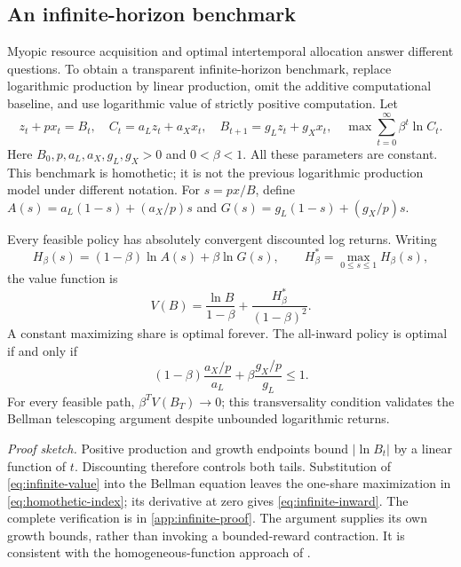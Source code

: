 \subsection{An infinite-horizon benchmark}
\label{sec:dynamic}
Myopic resource acquisition and optimal intertemporal allocation answer
different questions. To obtain a transparent infinite-horizon benchmark,
replace logarithmic production by linear production, omit the additive
computational baseline, and use logarithmic value of strictly positive
computation. Let
\begin{equation}
 z_t+px_t=B_t,\quad C_t=a_Lz_t+a_Xx_t,\quad
 B_{t+1}=g_Lz_t+g_Xx_t,\quad
 \max\sum_{t=0}^{\infty}\beta^t\ln C_t.
 \label{eq:infinite-model}
\end{equation}
Here $B_0,p,a_L,a_X,g_L,g_X>0$ and $0<\beta<1$.
All these parameters are constant. This benchmark is homothetic; it is
not the previous logarithmic production model under different notation.
For $s=px/B$, define
$A(s)=a_L(1-s)+(a_X/p)s$ and
$G(s)=g_L(1-s)+(g_X/p)s$.

\begin{proposition}
\label{prop:infinite}
Every feasible policy has absolutely convergent discounted log returns.
Writing
\begin{equation}
 H_\beta(s)=(1-\beta)\ln A(s)+\beta\ln G(s),\qquad
 H_\beta^*=\max_{0\leq s\leq1}H_\beta(s),
 \label{eq:homothetic-index}
\end{equation}
the value function is
\begin{equation}
 V(B)=\frac{\ln B}{1-\beta}
       +\frac{H_\beta^*}{(1-\beta)^2}.
 \label{eq:infinite-value}
\end{equation}
A constant maximizing share is optimal forever. The all-inward policy
is optimal if and only if
\begin{equation}
 (1-\beta)\frac{a_X/p}{a_L}
       +\beta\frac{g_X/p}{g_L}\leq1.
 \label{eq:infinite-inward}
\end{equation}
For every feasible path, $\beta^T V(B_T)\to0$; this transversality
condition validates the Bellman telescoping argument despite unbounded
logarithmic returns.
\end{proposition}
\noindent\emph{Proof sketch.}
Positive production and growth endpoints bound $|\ln B_t|$ by a linear
function of $t$. Discounting therefore controls both tails. Substitution
of \cref{eq:infinite-value} into the Bellman equation leaves the one-share
maximization in \cref{eq:homothetic-index}; its derivative at zero gives
\cref{eq:infinite-inward}. The complete verification is in
\cref{app:infinite-proof}. The argument supplies its own growth bounds,
rather than invoking a bounded-reward contraction. It is consistent with
the homogeneous-function approach of \citet{AlvarezStokey1998}.

